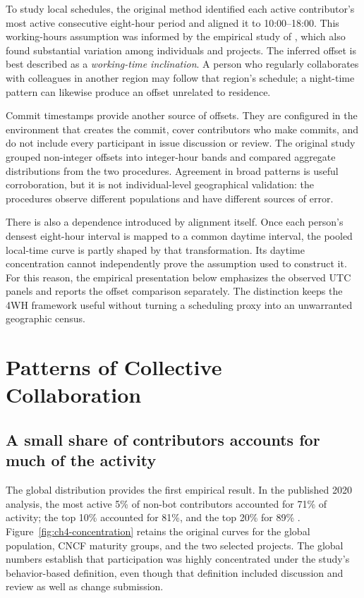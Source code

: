 To study local schedules, the original method identified each active contributor's most active consecutive eight-hour period and aligned it to 10:00--18:00. This working-hours assumption was informed by the empirical study of \citet{claes2018}, which also found substantial variation among individuals and projects. The inferred offset is best described as a \emph{working-time inclination}. A person who regularly collaborates with colleagues in another region may follow that region's schedule; a night-time pattern can likewise produce an offset unrelated to residence.

Commit timestamps provide another source of offsets. They are configured in the environment that creates the commit, cover contributors who make commits, and do not include every participant in issue discussion or review. The original study grouped non-integer offsets into integer-hour bands and compared aggregate distributions from the two procedures. Agreement in broad patterns is useful corroboration, but it is not individual-level geographical validation: the procedures observe different populations and have different sources of error.

There is also a dependence introduced by alignment itself. Once each person's densest eight-hour interval is mapped to a common daytime interval, the pooled local-time curve is partly shaped by that transformation. Its daytime concentration cannot independently prove the assumption used to construct it. For this reason, the empirical presentation below emphasizes the observed UTC panels and reports the offset comparison separately. The distinction keeps the 4WH framework useful without turning a scheduling proxy into an unwarranted geographic census.

\section{Patterns of Collective Collaboration}
\label{sec:ch4-patterns}

\subsection{A small share of contributors accounts for much of the activity}
The global distribution provides the first empirical result. In the published 2020 analysis, the most active 5\% of non-bot contributors accounted for 71\% of activity; the top 10\% accounted for 81\%, and the top 20\% for 89\% \citep[Section V.A]{xia2022}. Figure~\ref{fig:ch4-concentration} retains the original curves for the global population, CNCF maturity groups, and the two selected projects. The global numbers establish that participation was highly concentrated under the study's behavior-based definition, even though that definition included discussion and review as well as change submission.

